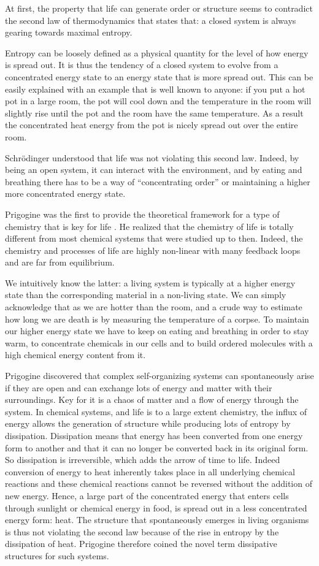 \documentclass[
  11pt,
]{book}
\begin{document}
At first, the property that life can generate order or structure seems to contradict the second law of thermodynamics that states that: a closed system is always gearing towards maximal entropy.

Entropy can be loosely defined as a physical quantity for the level of how energy is spread out. It is thus the tendency of a closed system to evolve from a concentrated energy state to an energy state that is more spread out. This can be easily explained with an example that is well known to anyone: if you put a hot pot in a large room, the pot will cool down and the temperature in the room will slightly rise until the pot and the room have the same temperature. As a result the concentrated heat energy from the pot is nicely spread out over the entire room.

Schrödinger understood that life was not violating this second law. Indeed, by being an open system, it can interact with the environment, and by eating and breathing there has to be a way of ``concentrating order'' or maintaining a higher more concentrated energy state.

Prigogine was the first to provide the theoretical framework for a type of chemistry that is key for life \citep{prigogineStengers1984}. He realized that the chemistry of life is totally different from most chemical systems that were studied up to then. Indeed, the chemistry and processes of life are highly non-linear with many feedback loops and are far from equilibrium.

We intuitively know the latter: a living system is typically at a higher energy state than the corresponding material in a non-living state. We can simply acknowledge that as we are hotter than the room, and a crude way to estimate how long we are death is by measuring the temperature of a corpse. To maintain our higher energy state we have to keep on eating and breathing in order to stay warm, to concentrate chemicals in our cells and to build ordered molecules with a high chemical energy content from it.

Prigogine discovered that complex self-organizing systems can spontaneously arise if they are open and can exchange lots of energy and matter with their surroundings.
Key for it is a chaos of matter and a flow of energy through the system.
In chemical systems, and life is to a large extent chemistry, the influx of energy allows the generation of structure while producing lots of entropy by dissipation. Dissipation means that energy has been converted from one energy form to another and that it can no longer be converted back in its original form. So dissipation is irreversible, which adds the arrow of time to life. Indeed conversion of energy to heat inherently takes place in all underlying chemical reactions and these chemical reactions cannot be reversed without the addition of new energy. Hence, a large part of the concentrated energy that enters cells through sunlight or chemical energy in food, is spread out in a less concentrated energy form: heat.
The structure that spontaneously emerges in living organisms is thus not violating the second law because of the rise in entropy by the dissipation of heat.
Prigogine therefore coined the novel term dissipative structures for such systems.
\end{document}
